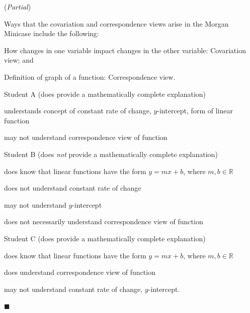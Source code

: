 \documentclass[11pt]{article}
\newcommand{\R}{\mathbb{R}}
\theoremstyle{definition}
\newenvironment{solution}{{\it Solution.} }{\hfill {\color{lightgray}$\blacksquare$}}
\begin{document}
\begin{solution}({\it Partial})

Ways that the covariation and correspondence views arise in the Morgan Minicase include the following:

\vspace*{-8pt}
\begin{itemize*}
\item How changes in one variable impact changes in the other variable: Covariation view; and 
\item Definition of graph of a function: Correspondence view.
\end{itemize*}

\vspace*{-4pt}
Student A (does provide a mathematically complete explanation)

\vspace*{-8pt}
\begin{itemize*}
\item understands concept of constant rate of change, $y$-intercept, form of linear function
\item may not understand correspondence view of function
\end{itemize*}

\vspace*{-4pt}
Student B (does {\it not} provide a mathematically complete explanation)

\vspace*{-8pt}
\begin{itemize*}
\item does know that linear functions have the form $y=mx+b$, where $m, b\in \R$
\item does not understand constant rate of change
\item may not understand $y$-intercept
\item does not necessarily understand correspondence view of function
\end{itemize*}

\vspace*{-4pt}
Student C (does provide a mathematically complete explanation)

\vspace*{-8pt}
\begin{itemize*}
\item does know that linear functions have the form $y=mx+b$, where $m, b\in \R$
\item does understand correspondence view of function
\item may not understand constant rate of change, $y$-intercept.
\end{itemize*} 
\end{solution}
\end{document}

